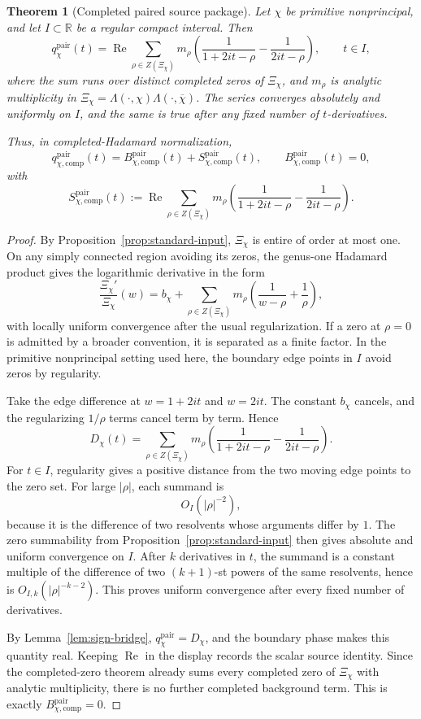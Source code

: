 \documentclass[11pt,a4paper]{amsart}
\theoremstyle{plain}
\newtheorem{theorem}{Theorem}[section]
\theoremstyle{definition}
\newcommand{\Real}{\operatorname{Re}}
\newcommand{\pair}{\mathrm{pair}}
\newcommand{\comp}{\mathrm{comp}}
\newcommand{\R}{\mathbb R}
\begin{document}
\begin{theorem}[Completed paired source package]
\label{thm:paired-source}
Let \(\chi\) be primitive nonprincipal, and let \(I\subset\R\) be a regular
compact interval.  Then
\[
  q_\chi^{\pair}(t)
  =
  \Real\sum_{\rho\in Z(\Xi_\chi)}
  m_\rho
  \left(
    \frac{1}{1+2it-\rho}
    -
    \frac{1}{2it-\rho}
  \right),
  \qquad t\in I,
\]
where the sum runs over distinct completed zeros of \(\Xi_\chi\), and
\(m_\rho\) is analytic multiplicity in
\(\Xi_\chi=\Lambda(\cdot,\chi)\Lambda(\cdot,\overline\chi)\).  The series
converges absolutely and uniformly on \(I\), and the same is true after any
fixed number of \(t\)-derivatives.

Thus, in completed-Hadamard normalization,
\[
  q_{\chi,\comp}^{\pair}(t)
  =
  B_{\chi,\comp}^{\pair}(t)
  +
  S_{\chi,\comp}^{\pair}(t),
  \qquad
  B_{\chi,\comp}^{\pair}(t)=0,
\]
with
\[
  S_{\chi,\comp}^{\pair}(t)
  :=
  \Real\sum_{\rho\in Z(\Xi_\chi)}
  m_\rho
  \left(
    \frac{1}{1+2it-\rho}
    -
    \frac{1}{2it-\rho}
  \right).
\]
\end{theorem}

\begin{proof}
By Proposition~\ref{prop:standard-input}, \(\Xi_\chi\) is entire of order at
most one.  On any simply connected region avoiding its zeros, the genus-one
Hadamard product gives the logarithmic derivative in the form
\[
  \frac{\Xi_\chi'}{\Xi_\chi}(w)
  =
  b_\chi+
  \sum_{\rho\in Z(\Xi_\chi)}
  m_\rho
  \left(
    \frac{1}{w-\rho}+\frac{1}{\rho}
  \right),
\]
with locally uniform convergence after the usual regularization.  If a zero at
\(\rho=0\) is admitted by a broader convention, it is separated as a finite
factor.  In the primitive nonprincipal setting used here, the boundary edge
points in \(I\) avoid zeros by regularity.

Take the edge difference at \(w=1+2it\) and \(w=2it\).  The constant
\(b_\chi\) cancels, and the regularizing \(1/\rho\) terms cancel term by term.
Hence
\[
  D_\chi(t)
  =
  \sum_{\rho\in Z(\Xi_\chi)}
  m_\rho
  \left(
    \frac{1}{1+2it-\rho}
    -
    \frac{1}{2it-\rho}
  \right).
\]
For \(t\in I\), regularity gives a positive distance from the two moving edge
points to the zero set.  For large \(|\rho|\), each summand is
\[
  O_I(|\rho|^{-2}),
\]
because it is the difference of two resolvents whose arguments differ by
\(1\).  The zero summability from Proposition~\ref{prop:standard-input} then
gives absolute and uniform convergence on \(I\).  After \(k\) derivatives in
\(t\), the summand is a constant multiple of the difference of two
\((k+1)\)-st powers of the same resolvents, hence is
\(O_{I,k}(|\rho|^{-k-2})\).  This proves uniform convergence after every fixed
number of derivatives.

By Lemma~\ref{lem:sign-bridge}, \(q_\chi^{\pair}=D_\chi\), and the boundary
phase makes this quantity real.  Keeping \(\Real\) in the display records the
scalar source identity.  Since the completed-zero theorem already sums every
completed zero of \(\Xi_\chi\) with analytic multiplicity, there is no further
completed background term.  This is exactly
\(B_{\chi,\comp}^{\pair}=0\).
\end{proof}
\end{document}
